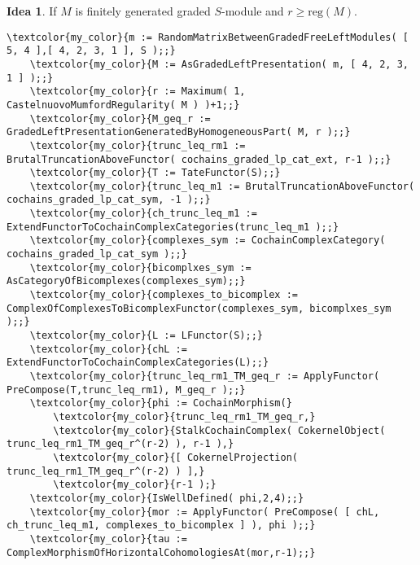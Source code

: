 \documentclass[16pt,a4paper]{extarticle}
\theoremstyle{definition}
\newtheorem{idea}{Idea}
\theoremstyle{theorem}
\begin{document}
    
    \begin{idea}
        If $M$ is finitely generated graded $S$-module and $r\geq\mathrm{reg}(M)$.
    \end{idea}
    \begin{Verbatim}[commandchars=\\\{\}, fontseries=b, frame=single, label=Gap Code, framerule=0.5mm, rulecolor=\color{rule_color} ]
    \textcolor{my_color}{m := RandomMatrixBetweenGradedFreeLeftModules( [ 5, 4 ],[ 4, 2, 3, 1 ], S );;}
    \textcolor{my_color}{M := AsGradedLeftPresentation( m, [ 4, 2, 3, 1 ] );;}
    \textcolor{my_color}{r := Maximum( 1, CastelnuovoMumfordRegularity( M ) )+1;;}
    \textcolor{my_color}{M_geq_r := GradedLeftPresentationGeneratedByHomogeneousPart( M, r );;}
    \textcolor{my_color}{trunc_leq_rm1 := BrutalTruncationAboveFunctor( cochains_graded_lp_cat_ext, r-1 );;}
    \textcolor{my_color}{T := TateFunctor(S);;}
    \textcolor{my_color}{trunc_leq_m1 := BrutalTruncationAboveFunctor( cochains_graded_lp_cat_sym, -1 );;}
    \textcolor{my_color}{ch_trunc_leq_m1 := ExtendFunctorToCochainComplexCategories(trunc_leq_m1 );;}
    \textcolor{my_color}{complexes_sym := CochainComplexCategory( cochains_graded_lp_cat_sym );;}
    \textcolor{my_color}{bicomplxes_sym := AsCategoryOfBicomplexes(complexes_sym);;}
    \textcolor{my_color}{complexes_to_bicomplex := ComplexOfComplexesToBicomplexFunctor(complexes_sym, bicomplxes_sym );;}
    \textcolor{my_color}{L := LFunctor(S);;}
    \textcolor{my_color}{chL := ExtendFunctorToCochainComplexCategories(L);;}
    \textcolor{my_color}{trunc_leq_rm1_TM_geq_r := ApplyFunctor( PreCompose(T,trunc_leq_rm1), M_geq_r );;}
    \textcolor{my_color}{phi := CochainMorphism(}
        \textcolor{my_color}{trunc_leq_rm1_TM_geq_r,}
        \textcolor{my_color}{StalkCochainComplex( CokernelObject( trunc_leq_rm1_TM_geq_r^(r-2) ), r-1 ),}
        \textcolor{my_color}{[ CokernelProjection( trunc_leq_rm1_TM_geq_r^(r-2) ) ],}
        \textcolor{my_color}{r-1 );}
    \textcolor{my_color}{IsWellDefined( phi,2,4);;}
    \textcolor{my_color}{mor := ApplyFunctor( PreCompose( [ chL, ch_trunc_leq_m1, complexes_to_bicomplex ] ), phi );;}
    \textcolor{my_color}{tau := ComplexMorphismOfHorizontalCohomologiesAt(mor,r-1);;}
    \end{Verbatim}
\end{document}
